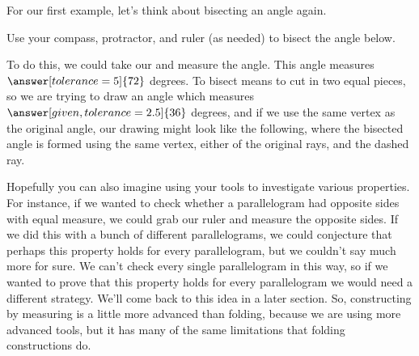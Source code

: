 \documentclass{ximera}
\begin{document}
For our first example, let's think about bisecting an angle again.
\begin{example}
Use your compass, protractor, and ruler (as needed) to bisect the angle below.
\begin{image}
\end{image}
To do this, we could take our  and measure the angle. This angle measures $\answer[tolerance=5]{72}$ degrees. To bisect means to cut in two equal pieces, so we are trying to draw an angle which measures $\answer[given,tolerance=2.5]{36}$ degrees, and if we use the same vertex as the original angle, our drawing might look like the following, where the bisected angle is formed using the same vertex, either of the original rays, and the dashed ray.
\begin{image}
\end{image}
\end{example}

Hopefully you can also imagine using your tools to investigate various properties. For instance, if we wanted to check whether a parallelogram had opposite sides with equal measure, we could grab our ruler and measure the opposite sides. If we did this with a bunch of different parallelograms, we could conjecture that perhaps this property holds for every parallelogram, but we couldn't say much more for sure. We can't check every single parallelogram in this way, so if we wanted to prove that this property holds for every parallelogram we would need a different strategy. We'll come back to this idea in a later section. So, constructing by measuring is a little more advanced than folding, because we are using more advanced tools, but it has many of the same limitations that folding constructions do.
\end{document}
